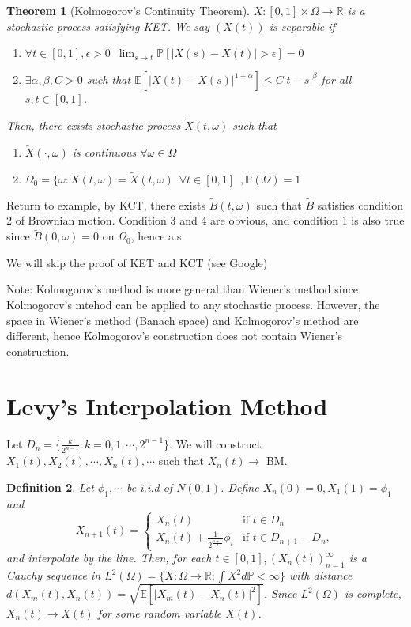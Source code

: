 \documentclass[12pt]{report}
\newcommand{\R}{\mathbb{R}}
\renewcommand{\P}{\mathbb{P}}
\newcommand{\E}{\mathbb{E}}
\renewcommand{\1}{\mathbb{1}}
\renewcommand{\O}{\Omega}
\theoremstyle{break}
\newtheorem{thm}{Theorem}[section] %
\theoremstyle{newdef}
\newtheorem{defn}[thm]{Definition} %
\theoremstyle{remark}
\begin{document}
\begin{thm}[Kolmogorov's Continuity Theorem]
$X: [0,1]\times\O\rightarrow\R$ is a stochastic process satisfying KET.
We say $(X(t))$ is separable if
\begin{enumerate}
\item $\forall t \in [0,1], \epsilon > 0 \enspace \lim_{s\rightarrow t} \P[|X(s)-X(t)| > \epsilon]=0$
\item $\exists \alpha,\beta,C > 0$ such that $\E[|X(t)-X(s)|^{1+\alpha}] \leq C|t-s|^\beta$ for all $s,t\in[0,1]$.
\end{enumerate}
Then, there exists stochastic process $\widetilde{X}(t,\omega)$ such that
\begin{enumerate}
\item $\widetilde{X}(\cdot,\omega)$ is continuous $\forall \omega \in \O$
\item $\O_0 = \{ \omega : X(t,\omega) = \widetilde{X}(t,\omega) \enspace \forall t\in[0,1] \enspace, \P(\O)=1$
\end{enumerate}
\end{thm}


Return to example, by KCT, there exists $\widetilde{B}(t,\omega)$ such that $\widetilde{B}$ satisfies condition 2 of Brownian motion.
Condition 3 and 4 are obvious, and condition 1 is also true since $\widetilde{B}(0,\omega) = 0$ on $\O_0$, hence a.s.



We will skip the proof of KET and KCT (see Google)


Note:
Kolmogorov's method is more general than Wiener's method since Kolmogorov's mtehod can be applied to any stochastic process.
However, the space in Wiener's method (Banach space) and Kolmogorov's method are different, hence Kolmogorov's construction does not contain Wiener's construction.





\section{Levy's Interpolation Method}

Let $D_n = \{\frac{k}{2^{n-1}} : k = 0,1,\cdots,2^{n-1}\}$.
We will construct $X_1(t), X_2(t), \cdots, X_n(t), \cdots$ such that $X_n(t) \rightarrow$ BM.

\begin{defn}
Let $\phi_1,\cdots$ be i.i.d of $N(0,1)$. Define $X_n(0) = 0, X_1(1) = \phi_1$ and
$$
X_{n+1}(t) =
\begin{cases}
    X_n(t) & \text{if } t \in D_n\\
    X_n(t) + \frac{1}{2^{\frac{n+1}{2}}} \phi_i & \text{if } t \in D_{n+1} - D_n,
\end{cases}
$$
and interpolate by the line.
Then, for each $t \in [0,1], (X_n(t))_{n=1}^\infty$ is a Cauchy sequence in $L^2(\O) = \{ X: \O \rightarrow \R ; \int X^2 d\P < \infty \}$ with distance $d(X_m(t), X_n(t)) = \sqrt{\E[|X_m(t) - X_n(t)|^2]}$.
Since $L^2(\O)$ is complete, $X_n(t) \rightarrow X(t)$ for some random variable $X(t)$.
\end{defn}
\end{document}
